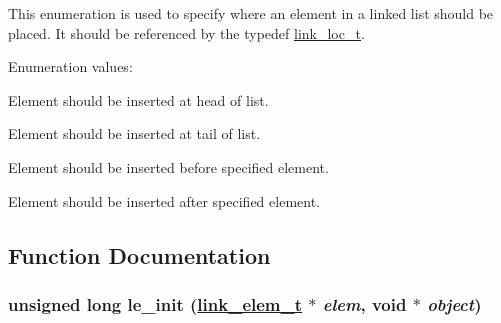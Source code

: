 This enumeration is used to specify where an element in a linked list should be placed. It should be referenced by the typedef \hyperlink{group__dbprim__link_a4}{link\_\-loc\_\-t}. \begin{Desc}
\item[Enumeration values: ]\par
\begin{description}
\item[{\em 
\hypertarget{group__dbprim__link_a26a131}{
{\em LINK\_\-LOC\_\-HEAD}}
\label{group__dbprim__link_a26a131}
}]Element should be inserted at head of list. \item[{\em 
\hypertarget{group__dbprim__link_a26a132}{
{\em LINK\_\-LOC\_\-TAIL}}
\label{group__dbprim__link_a26a132}
}]Element should be inserted at tail of list. \item[{\em 
\hypertarget{group__dbprim__link_a26a133}{
{\em LINK\_\-LOC\_\-BEFORE}}
\label{group__dbprim__link_a26a133}
}]Element should be inserted before specified element. \item[{\em 
\hypertarget{group__dbprim__link_a26a134}{
{\em LINK\_\-LOC\_\-AFTER}}
\label{group__dbprim__link_a26a134}
}]Element should be inserted after specified element. \end{description}
\end{Desc}



\subsection{Function Documentation}
\hypertarget{group__dbprim__link_a12}{
\subsubsection[le\_\-init]{\setlength{\rightskip}{0pt plus 5cm}unsigned long le\_\-init (\hyperlink{group__dbprim__link_a1}{link\_\-elem\_\-t} $\ast$ {\em elem}, void $\ast$ {\em object})}}
\label{group__dbprim__link_a12}


